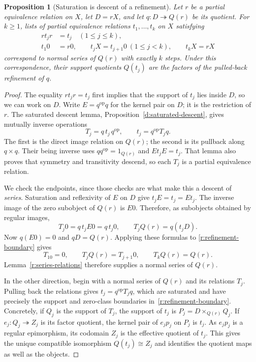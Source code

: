 \documentclass[11pt]{article}
\newtheorem{proposition}[theorem]{Proposition}
\theoremstyle{definition}
\theoremstyle{remark}\newtheorem{remark}[theorem]{Remark}
\begin{document}
\begin{proposition}[Saturation is descent of a refinement]
\label{r:refinement-descent}
Let $r$ be a partial equivalence relation on $X$, let $D=rX$, and let
$q:D\twoheadrightarrow Q(r)$ be its quotient.  For $k\geq1$, lists of
partial equivalence relations $t_1,\ldots,t_k$ on $X$ satisfying
\begin{align}
 rt_jr&=t_j \quad(1\leq j\leq k), \label{r:saturation}\\
 t_1 0&=r0,\qquad t_jX=t_{j+1}0\ (1\leq j<k),\qquad
 t_kX=rX \label{r:refinement-boundary}
\end{align}
correspond to normal series of $Q(r)$ with exactly $k$ steps. Under this correspondence, their
support quotients $Q(t_j)$ are the factors of the pulled-back refinement
of $q$.
\end{proposition}

\begin{proof}
The equality $rt_jr=t_j$ first implies that the support of $t_j$ lies
inside $D$, so we can work on $D$.  Write $E=q^{\mathrm{op}}q$ for the
kernel pair on $D$; it is the restriction of $r$.  The saturated descent
lemma, Proposition~\ref{d:saturated-descent}, gives mutually inverse
operations
\[
       T_j=q\,t_j\,q^{\mathrm{op}},\qquad
       t_j=q^{\mathrm{op}}T_jq.
\]
The first is the direct image relation on $Q(r)$; the second is its
pullback along $q\times q$.  Their being inverse uses $qq^{\mathrm{op}}
=1_{Q(r)}$ and $Et_jE=t_j$.  That lemma also proves that symmetry and
transitivity descend, so each $T_j$ is a partial equivalence relation.

We check the endpoints, since those checks are what make this a descent
of \emph{series}.  Saturation and reflexivity of $E$ on $D$ give
$t_jE=t_j=Et_j$.  The inverse image of the zero subobject of $Q(r)$ is
$E0$.  Therefore, as subobjects obtained by regular images,
\[
             T_j0=q\,t_jE0=q\,t_j0,
       \qquad T_jQ(r)=q(t_jD).
\]
Now $q(E0)=0$ and $qD=Q(r)$.  Applying these formulas to
\eqref{r:refinement-boundary} gives
\[
 T_10=0,\qquad T_jQ(r)=T_{j+1}0,\qquad T_kQ(r)=Q(r).
\]
Lemma~\ref{r:series-relations} therefore supplies a normal series of
$Q(r)$.

In the other direction, begin with a normal series of $Q(r)$ and its
relations $T_j$.  Pulling back the relations gives $t_j=q^{\mathrm{op}}T_jq$,
which are saturated and have precisely the support and zero-class
boundaries in~\eqref{r:refinement-boundary}.  Concretely, if $Q_j$ is the
support of $T_j$, the support of $t_j$ is $P_j=D\times_{Q(r)}Q_j$.
If $e_j:Q_j\twoheadrightarrow Z_j$ is its factor quotient, the kernel pair
of $e_jp_j$ on $P_j$ is $t_j$.  As $e_jp_j$ is a regular epimorphism,
its codomain $Z_j$ is the effective quotient of $t_j$.  This gives the
unique compatible isomorphism $Q(t_j)\cong Z_j$ and identifies the
quotient maps as well as the objects.
\end{proof}
\end{document}
